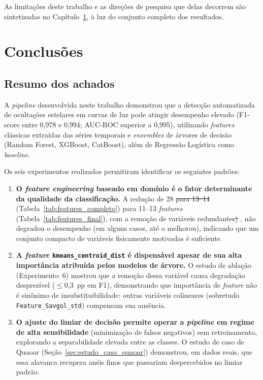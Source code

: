 \documentclass[msc]{on} %
\makeatletter
\providecommand{\DIFaddtex}[1]{{\protect\color{red}#1}} %
\providecommand{\DIFdeltex}[1]{{\protect\color{red}\sout{#1}}} %
\providecommand{\DIFaddbegin}{} %
\providecommand{\DIFaddend}{} %
\providecommand{\DIFdelbegin}{} %
\providecommand{\DIFdelend}{} %
\providecommand{\DIFadd}[1]{\texorpdfstring{\DIFaddtex{#1}}{#1}} %
\providecommand{\DIFdel}[1]{\texorpdfstring{\DIFdeltex{#1}}{}} %
\let\sout@orig\sout %
\renewcommand{\sout}[1]{\ifmmode\text{\sout@orig{\ensuremath{#1}}}\else\sout@orig{#1}\fi} %
\makeatother
\begin{document}
As limitações deste trabalho e as direções de pesquisa que delas decorrem são sintetizadas no Capítulo~\ref{cap:conclusoes}, à luz do conjunto completo dos resultados.


\chapter{Conclusões}
\label{cap:conclusoes}

\section{Resumo dos achados}

A \textit{pipeline} desenvolvida neste trabalho demonstrou que a detecção automatizada de ocultações estelares em curvas de luz pode atingir desempenho elevado (F1-score entre 0,978 e 0,994; AUC-ROC superior a 0,995), utilizando \textit{features} clássicas extraídas das séries temporais e \textit{ensembles} de árvores de decisão (Random Forest, XGBoost, CatBoost), além de Regressão Logística como \textit{baseline}.

Os seis experimentos realizados permitiram identificar os seguintes padrões:

\begin{enumerate}
	\item \textbf{O \textit{feature engineering} baseado em domínio é o fator determinante da qualidade da classificação.} A redução de 28 \DIFdelbegin \DIFdel{para 13--14 }\DIFdelend \DIFaddbegin \DIFadd{(Tabela~\ref{tab:features_completo}) para 11--13 }\DIFaddend \textit{features} (\DIFaddbegin \DIFadd{Tabela~\ref{tab:features_final}), com a }\DIFaddend remoção de variáveis redundantes\DIFdelbegin \DIFdel{) }\DIFdelend \DIFaddbegin \DIFadd{, }\DIFaddend não degradou o desempenho (em alguns casos, até o melhorou), indicando que um conjunto compacto de variáveis fisicamente motivadas é suficiente.

	\item \textbf{A \textit{feature} \texttt{kmeans\_centroid\_dist} é dispensável apesar de sua alta importância atribuída pelos modelos de árvore.} O estudo de ablação (Experimento~6) mostrou que a remoção dessa variável causa degradação desprezível ($\leq$0,3~pp em F1), demonstrando que importância de \textit{feature} não é sinônimo de insubstituibilidade: outras variáveis colineares (sobretudo \texttt{Feature\_Savgol\_std}) compensam sua ausência.

	\item \textbf{O ajuste do limiar de decisão permite operar a \textit{pipeline} em regime de alta sensibilidade} (minimização de falsos negativos) sem retreinamento, explorando a separabilidade elevada entre as classes. O estudo de caso de Quaoar (Seção~\ref{sec:estudo_caso_quaoar}) demonstrou, em dados reais, que essa alavanca recupera anéis finos que passariam despercebidos no limiar padrão.
\end{enumerate}
\end{document}
